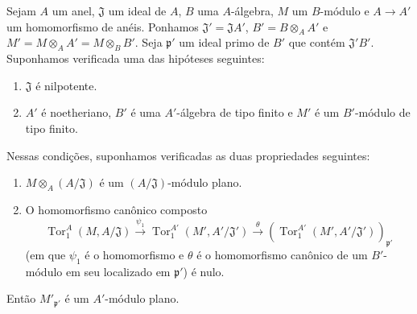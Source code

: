 \begin{lemma}[11.2.5]
\label{IV.11.2.5}
Sejam $A$ um anel, $\mathfrak J$ um ideal de $A$, $B$ uma $A$-álgebra, $M$ um $B$-módulo e $A\to A'$ um homomorfismo de anéis. Ponhamos $\mathfrak J'=\mathfrak JA'$, $B'=B\otimes_AA'$ e $M'=M\otimes_AA'=M\otimes_BB'$. Seja $\mathfrak p'$ um ideal primo de $B'$ que contém $\mathfrak J'B'$. Suponhamos verificada uma das hipóteses seguintes:
\begin{enumerate}[label=\emph{\alph*)}]
\item $\mathfrak J$ é nilpotente.
\item $A'$ é noetheriano, $B'$ é uma $A'$-álgebra de tipo finito e $M'$ é um $B'$-módulo de tipo finito.
\end{enumerate}
Nessas condições, suponhamos verificadas as duas propriedades seguintes:
\begin{enumerate}[label=\emph{(\roman*)}]
\item $M\otimes_A(A/\mathfrak J)$ é um $(A/\mathfrak J)$-módulo plano.
\item O homomorfismo canônico composto
\[
\operatorname{Tor}_1^A(M,A/\mathfrak J)\xrightarrow{\psi_1}
\operatorname{Tor}_1^{A'}(M',A'/\mathfrak J')\xrightarrow{\theta}
(\operatorname{Tor}_1^{A'}(M',A'/\mathfrak J'))_{\mathfrak p'}
\]
(em que $\psi_1$ é o homomorfismo  e $\theta$ é o homomorfismo canônico de um $B'$-módulo em seu localizado em $\mathfrak p'$) é nulo.
\end{enumerate}
Então $M'_{\mathfrak p'}$ é um $A'$-módulo plano.
\end{lemma}


